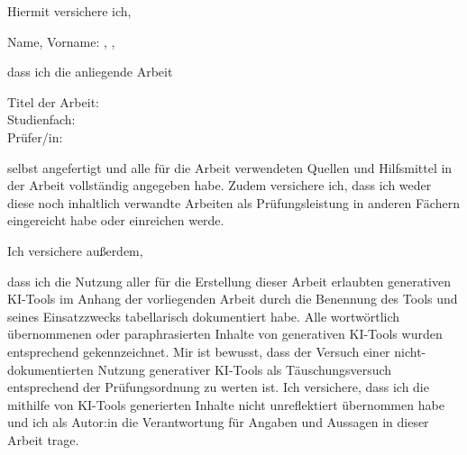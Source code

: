 
Hiermit versichere ich,

\vspace{0.5em}

Name, Vorname: \autorNachname, \autorVorname,

\vspace{0.5em}

dass ich die anliegende Arbeit

\vspace{0.5em}

Titel der Arbeit: \titel \\
Studienfach: \studiengang \\
Prüfer/in: \betreuer

\vspace{0.5em}

selbst angefertigt und alle für die Arbeit verwendeten Quellen und Hilfsmittel in der Arbeit vollständig angegeben habe. Zudem versichere ich, dass ich weder diese noch inhaltlich verwandte Arbeiten als Prüfungsleistung in anderen Fächern eingereicht habe oder einreichen werde.

\vspace{0.5em}


Ich versichere außerdem, 


\vspace{0.5em}

dass ich die Nutzung aller für die Erstellung dieser Arbeit erlaubten generativen KI-Tools im Anhang der vorliegenden Arbeit durch die Benennung des Tools und seines Einsatzzwecks tabellarisch dokumentiert habe. Alle wortwörtlich übernommenen oder paraphrasierten Inhalte von generativen KI-Tools wurden entsprechend gekennzeichnet. Mir ist bewusst, dass der Versuch einer nicht-dokumentierten Nutzung generativer KI-Tools als Täuschungsversuch entsprechend der Prüfungsordnung zu werten ist. Ich versichere, dass ich die mithilfe von KI-Tools generierten Inhalte nicht unreflektiert übernommen habe und ich als Autor:in die Verantwortung für Angaben und Aussagen in dieser Arbeit trage.

